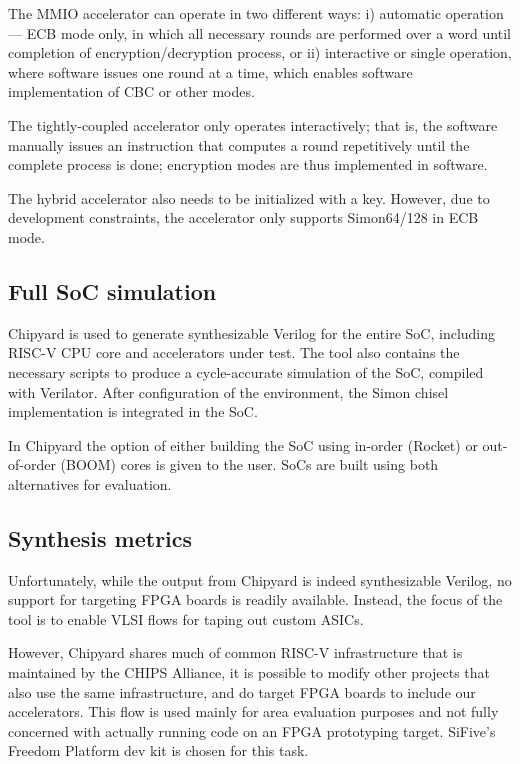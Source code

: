 \documentclass[10pt,conference]{IEEEtran}
\begin{document}
The MMIO accelerator can operate in two different ways: i) automatic
operation --- ECB mode only, in which all necessary rounds are performed over a word until
completion of encryption/decryption process, or ii) interactive or single operation, where
software issues one round at a time, which enables software implementation of
CBC or other modes.

The tightly-coupled accelerator only operates interactively; that is, the
software manually issues an instruction that computes a round repetitively
until the complete process is done; encryption modes are thus
implemented in software.

The hybrid accelerator also needs to be initialized with a key. However, due to
development constraints, the accelerator only supports Simon64/128 in ECB mode.


\subsection{Full SoC simulation}

Chipyard is used to generate synthesizable Verilog for the
entire SoC, including RISC-V CPU core and accelerators under test. The tool also
contains the necessary scripts to produce a cycle-accurate simulation of the
SoC, compiled with Verilator. After configuration of the environment, the Simon
chisel implementation is integrated in the SoC.

In Chipyard the option of either building the SoC using in-order (Rocket) or
out-of-order (BOOM) cores is given to the user. SoCs are built using both
alternatives for evaluation.

\subsection{Synthesis metrics}

Unfortunately, while the output from Chipyard is indeed synthesizable Verilog,
no support for targeting FPGA boards is readily available. Instead, the focus of
the tool is to enable VLSI flows for taping out custom ASICs.

However, Chipyard shares much of common RISC-V infrastructure that is maintained
by the CHIPS Alliance, it is possible to modify other projects that also use the
same infrastructure, and do target FPGA boards to include our accelerators. This
flow is used mainly for area evaluation purposes and not fully concerned with
actually running code on an FPGA prototyping target. SiFive's Freedom Platform
dev kit is chosen for this task.
\end{document}
